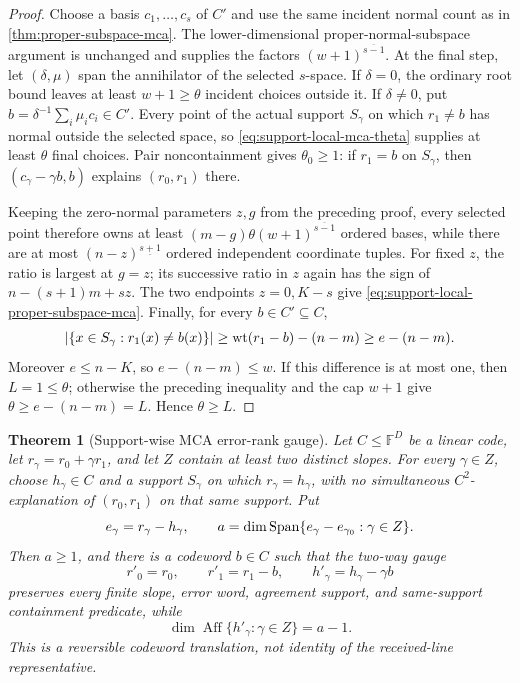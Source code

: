 \documentclass[11pt,a4paper]{amsart}
\numberwithin{equation}{section}
\newtheorem{theorem}{Theorem}[section]
\theoremstyle{remark}
\newcommand{\F}{\mathbb F}\newcommand{\B}{\mathbb B}\newcommand{\K}{\mathbb K}\newcommand{\Z}{\mathbb Z}
\begin{document}
\begin{proof}
Choose a basis \(c_1,\ldots,c_s\) of \(C'\) and use the same incident
normal count as in \cref{thm:proper-subspace-mca}.  The lower-dimensional
proper-normal-subspace argument is unchanged and supplies the factors
\((w+1)^{\overline{s-1}}\).  At the final step, let
\((\delta,\mu)\) span the annihilator of the selected \(s\)-space.  If
\(\delta=0\), the ordinary root bound leaves at least
\(w+1\ge\theta\) incident choices outside it.  If \(\delta\ne0\), put
\(b=\delta^{-1}\sum_i\mu_i c_i\in C'\).  Every point of the actual
support \(S_\gamma\) on which \(r_1\ne b\) has normal outside the
selected space, so \eqref{eq:support-local-mca-theta} supplies at least
\(\theta\) final choices.  Pair noncontainment gives \(\theta_0\ge1\):
if \(r_1=b\) on \(S_\gamma\), then
\((c_\gamma-\gamma b,b)\) explains \((r_0,r_1)\) there.

Keeping the zero-normal parameters $z,g$ from the preceding proof, every
selected point therefore owns at least
\((m-g)\theta(w+1)^{\overline{s-1}}\) ordered bases, while there are at
most $(n-z)^{\underline{s+1}}$ ordered independent coordinate tuples.
For fixed $z$, the ratio is largest at $g=z$; its successive ratio in
$z$ again has the sign of $n-(s+1)m+sz$.  The two endpoints
$z=0,K-s$ give \eqref{eq:support-local-proper-subspace-mca}.
Finally, for every \(b\in C'\subseteq C\),
\[
 |\{x\in S_\gamma:r_1(x)\ne b(x)\}|
\ge \operatorname{wt}(r_1-b)-(n-m)\ge e-(n-m).
\]
Moreover \(e\le n-K\), so \(e-(n-m)\le w\).  If this difference is at
most one, then $L=1\le\theta$; otherwise the preceding inequality and
the cap $w+1$ give \(\theta\ge e-(n-m)=L\).  Hence \(\theta\ge L\).
\end{proof}

\begin{theorem}[Support-wise MCA error-rank gauge]
\label{thm:mca-error-rank-gauge}
Let \(C\le\F^D\) be a linear code, let
\(r_\gamma=r_0+\gamma r_1\), and let \(Z\) contain at least two distinct
slopes.  For every \(\gamma\in Z\), choose \(h_\gamma\in C\) and a
support \(S_\gamma\) on which \(r_\gamma=h_\gamma\), with no
simultaneous \(C^2\)-explanation of \((r_0,r_1)\) on that same support.
Put
\[
 e_\gamma=r_\gamma-h_\gamma,
 \qquad
 a=\dim\operatorname{Span}\{e_\gamma-e_{\gamma_0}:\gamma\in Z\}.
\]
Then \(a\ge1\), and there is a codeword \(b\in C\) such that the
two-way gauge
\begin{equation}
 r'_0=r_0,\qquad r'_1=r_1-b,
 \qquad h'_\gamma=h_\gamma-\gamma b
 \label{eq:mca-error-rank-gauge}
\end{equation}
preserves every finite slope, error word, agreement support, and
same-support containment predicate, while
\[
 \dim\operatorname{Aff}\{h'_\gamma:\gamma\in Z\}=a-1.
\]
This is a reversible codeword translation, not identity of the received-line
representative.
\end{theorem}
\end{document}
